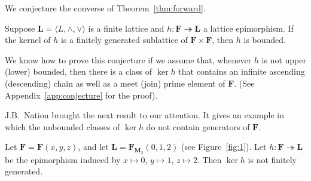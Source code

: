 We conjecture the converse of Theorem~\ref{thm:forward}.
\begin{conjecture}
Suppose $\mathbf L = \langle L, \wedge, \vee\rangle$ is a finite lattice and 
$h\colon \mathbf F \twoheadrightarrow \mathbf L$ a lattice epimorphism.
If the kernel of $h$ is a finitely generated sublattice 
of $\mathbf F \times \mathbf F$, then $h$ is bounded.
\end{conjecture}
We know how to prove this conjecture if we assume that, 
whenever $h$ is not upper (lower) bounded, then there is a class of 
$\ker h$ that contains an infinite ascending (descending) chain as well as a meet (join)
prime element of $\mathbf F$. (See Appendix~\ref{app:conjecture} for the proof). 

J.B.~Nation brought the next result to our attention.  
It gives an example in which the unbounded
classes of $\ker h$ do not contain generators of $\mathbf F$.
\begin{proposition}
Let $\mathbf{F} = \mathbf{F}(x,y,z)$, and let $\mathbf{L} = \mathbf{F}_{\mathbf{M}_3}(0,1,2)$ (see Figure~\ref{fig:1}).  
Let $h\colon \mathbf{F} \twoheadrightarrow \mathbf{L}$ be the epimorphism induced by $x\mapsto 0$, $y\mapsto 1$, $z\mapsto 2$. Then $\operatorname{ker}h$ is not finitely generated.  
\end{proposition}

